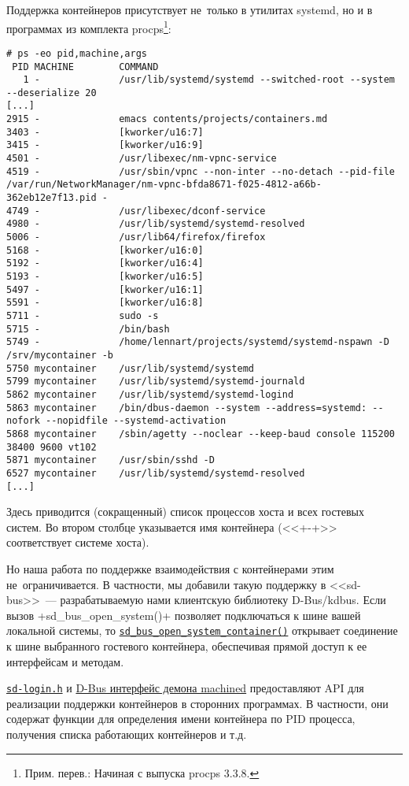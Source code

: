 \documentclass[10pt,oneside,a4paper]{article}
\newcommand{\hreftt}[2]{\href{#1}{\texttt{#2}}}
\begin{document}
Поддержка контейнеров присутствует не~только в утилитах systemd, но и в
программах из комплекта procps\footnote{Прим. перев.: Начиная с выпуска procps
3.3.8.}:
\begin{Verbatim}[fontsize=\small]
# ps -eo pid,machine,args
 PID MACHINE        COMMAND
   1 -              /usr/lib/systemd/systemd --switched-root --system --deserialize 20
[...]
2915 -              emacs contents/projects/containers.md
3403 -              [kworker/u16:7]
3415 -              [kworker/u16:9]
4501 -              /usr/libexec/nm-vpnc-service
4519 -              /usr/sbin/vpnc --non-inter --no-detach --pid-file /var/run/NetworkManager/nm-vpnc-bfda8671-f025-4812-a66b-362eb12e7f13.pid -
4749 -              /usr/libexec/dconf-service
4980 -              /usr/lib/systemd/systemd-resolved
5006 -              /usr/lib64/firefox/firefox
5168 -              [kworker/u16:0]
5192 -              [kworker/u16:4]
5193 -              [kworker/u16:5]
5497 -              [kworker/u16:1]
5591 -              [kworker/u16:8]
5711 -              sudo -s
5715 -              /bin/bash
5749 -              /home/lennart/projects/systemd/systemd-nspawn -D /srv/mycontainer -b
5750 mycontainer    /usr/lib/systemd/systemd
5799 mycontainer    /usr/lib/systemd/systemd-journald
5862 mycontainer    /usr/lib/systemd/systemd-logind
5863 mycontainer    /bin/dbus-daemon --system --address=systemd: --nofork --nopidfile --systemd-activation
5868 mycontainer    /sbin/agetty --noclear --keep-baud console 115200 38400 9600 vt102
5871 mycontainer    /usr/sbin/sshd -D
6527 mycontainer    /usr/lib/systemd/systemd-resolved
[...]
\end{Verbatim}
Здесь приводится (сокращенный) список процессов хоста и всех гостевых систем.
Во втором столбце указывается имя контейнера (<<+-+>> соответствует системе
хоста).

Но наша работа по поддержке взаимодействия с контейнерами этим
не~ограничивается. В частности, мы добавили такую поддержку в <<sd-bus>>~---
разрабатываемую нами клиентскую библиотеку D-Bus/kdbus. Если вызов
+sd_bus_open_system()+ позволяет подключаться к шине вашей локальной системы, то
\hreftt{http://www.freedesktop.org/software/systemd/man/sd_bus_open_system_container.html}{sd\_bus\_open\_system\_container()}
открывает соединение к шине выбранного гостевого контейнера, обеспечивая прямой
доступ к ее интерфейсам и методам.

\hreftt{http://www.freedesktop.org/software/systemd/man/sd_pid_get_machine_name.html}{sd-login.h}
и \href{http://www.freedesktop.org/wiki/Software/systemd/machined/}{D-Bus
интерфейс демона machined} предоставляют API для реализации поддержки
контейнеров в сторонних программах. В частности, они содержат функции для
определения имени контейнера по PID процесса, получения списка работающих
контейнеров и т.д.
\end{document}
